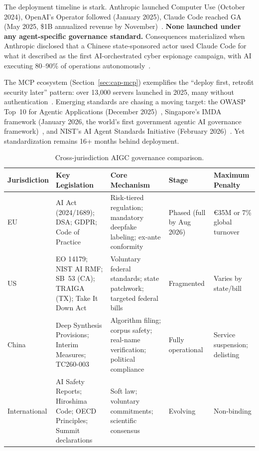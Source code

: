 The deployment timeline is stark. Anthropic launched Computer Use (October 2024), OpenAI's Operator followed (January 2025), Claude Code reached GA (May 2025, \$1B annualized revenue by November)~\cite{anthropic2024computeruse,openaicopilot}. \textbf{None launched under any agent-specific governance standard.} Consequences materialized when Anthropic disclosed that a Chinese state-sponsored actor used Claude Code for what it described as the first AI-orchestrated cyber espionage campaign, with AI executing 80--90\% of operations autonomously~\cite{anthropic2025gtg1002}.

The MCP ecosystem (Section~\ref{sec:cap-mcp}) exemplifies the ``deploy first, retrofit security later'' pattern: over 13,000 servers launched in 2025, many without authentication~\cite{zenity2025mcp}. Emerging standards are chasing a moving target: the OWASP Top~10 for Agentic Applications (December 2025)~\cite{owasp2025agentic}, Singapore's IMDA framework (January 2026, the world's first government agentic AI governance framework)~\cite{imda2026agentic}, and NIST's AI Agent Standards Initiative (February 2026)~\cite{nist2026agentstandards}. Yet standardization remains 16+ months behind deployment.

\begin{table}[htbp]
\centering
\caption{Cross-jurisdiction AIGC governance comparison.}
\label{tab:governance}
\small
\begin{tabular}{p{1.8cm}p{3.2cm}p{2.8cm}p{2.0cm}p{2.8cm}}
\toprule
\textbf{Jurisdiction} & \textbf{Key Legislation} & \textbf{Core Mechanism} & \textbf{Stage} & \textbf{Maximum Penalty} \\
\midrule
EU &
AI Act (2024/1689); DSA; GDPR; Code of Practice &
Risk-tiered regulation; mandatory deepfake labeling; ex-ante conformity &
Phased (full by Aug 2026) &
\euro35M or 7\% global turnover \\
\addlinespace
US &
EO 14179; NIST AI RMF; SB~53 (CA); TRAIGA (TX); Take It Down Act &
Voluntary federal standards; state patchwork; targeted federal bills &
Fragmented &
Varies by state/bill \\
\addlinespace
China &
Deep Synthesis Provisions; Interim Measures; TC260-003 &
Algorithm filing; corpus safety; real-name verification; political compliance &
Fully operational &
Service suspension; delisting \\
\addlinespace
International &
AI Safety Reports; Hiroshima Code; OECD Principles; Summit declarations &
Soft law; voluntary commitments; scientific consensus &
Evolving &
Non-binding \\
\bottomrule
\end{tabular}
\end{table}
